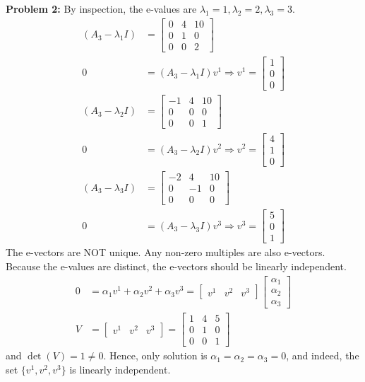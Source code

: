 \documentclass[letterpaper]{article}
\begin{document}
\noindent \textbf{Problem 2:}
By inspection, the e-values are $\lambda_1 = 1, \lambda_2 = 2, \lambda_3 = 3$.
$$\begin{aligned}
(A_3 - \lambda_1 I)&=\left[ \begin{array}{ccc} 0 & 4 & 10 \\ 0 & 1 & 0 \\ 0& 0& 2 \end{array} \right] \\
0 &= (A_3 - \lambda_1 I) v^1 \Rightarrow v^1 = \begin{bmatrix} 1 \\ 0 \\ 0 \end{bmatrix} \\
(A_3 - \lambda_2 I)&=\left[ \begin{array}{ccc} -1 & 4 & 10 \\ 0 & 0 & 0 \\ 0& 0& 1 \end{array} \right] \\
0 &= (A_3 - \lambda_2 I) v^2 \Rightarrow v^2 = \begin{bmatrix} 4 \\ 1 \\ 0 \end{bmatrix} \\
(A_3 - \lambda_3 I)&=\left[ \begin{array}{ccc} -2 & 4 & 10 \\ 0 & -1 & 0 \\ 0& 0& 0 \end{array} \right] \\
0 &= (A_3 - \lambda_3 I) v^3 \Rightarrow v^3 = \begin{bmatrix} 5 \\ 0 \\ 1 \end{bmatrix}
\end{aligned}$$
The e-vectors are NOT unique. Any non-zero multiples are also e-vectors. \medskip \\
Because the e-values are distinct, the e-vectors should be linearly independent.
$$\begin{aligned}
0&=\alpha_1 v^1 + \alpha_2 v^2 + \alpha_3 v^3 = \left[\begin{array}{c|c|c} v^1 & v^2 & v^3\end{array}\right] \begin{bmatrix} \alpha_1 \\ \alpha_2 \\ \alpha_3 \end{bmatrix} \\
V &= \left[\begin{array}{c|c|c} v^1 & v^2 & v^3\end{array}\right] = \left[\begin{array}{ccc} 1 & 4 & 5\\ 0 & 1 & 0 \\ 0& 0& 1 \end{array}\right]
\end{aligned}$$
and $\det(V) = 1 \not= 0$. Hence, only solution is $\alpha_1 = \alpha_2 = \alpha_3 =0$, and indeed, the set $\{v^1 , v^2 , v^3 \}$ is linearly independent.
\end{document}
